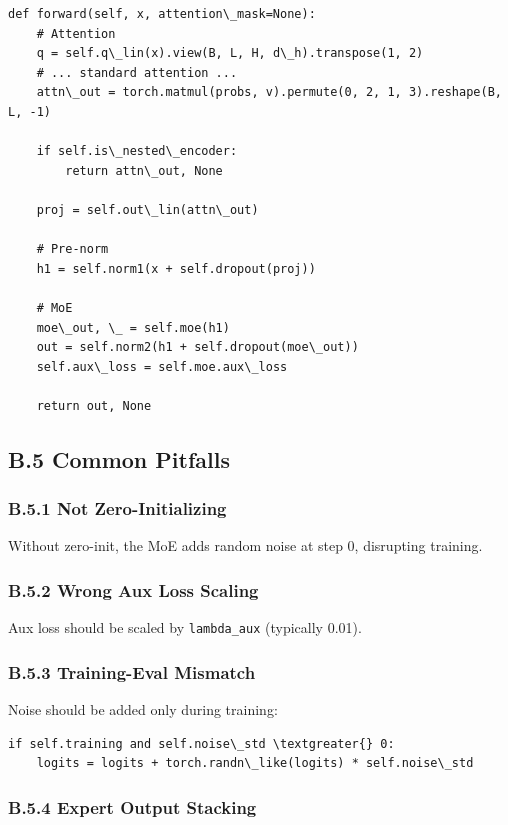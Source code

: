 \begin{lstlisting}
def forward(self, x, attention\_mask=None):
    # Attention
    q = self.q\_lin(x).view(B, L, H, d\_h).transpose(1, 2)
    # ... standard attention ...
    attn\_out = torch.matmul(probs, v).permute(0, 2, 1, 3).reshape(B, L, -1)
    
    if self.is\_nested\_encoder:
        return attn\_out, None
    
    proj = self.out\_lin(attn\_out)
    
    # Pre-norm
    h1 = self.norm1(x + self.dropout(proj))
    
    # MoE
    moe\_out, \_ = self.moe(h1)
    out = self.norm2(h1 + self.dropout(moe\_out))
    self.aux\_loss = self.moe.aux\_loss
    
    return out, None
\end{lstlisting}

\subsection{B.5 Common Pitfalls}

\subsubsection{B.5.1 Not Zero-Initializing}

Without zero-init, the MoE adds random noise at step 0, disrupting training.

\subsubsection{B.5.2 Wrong Aux Loss Scaling}

Aux loss should be scaled by \texttt{lambda\_aux} (typically 0.01).

\subsubsection{B.5.3 Training-Eval Mismatch}

Noise should be added only during training:

\begin{lstlisting}
if self.training and self.noise\_std \textgreater{} 0:
    logits = logits + torch.randn\_like(logits) * self.noise\_std
\end{lstlisting}

\subsubsection{B.5.4 Expert Output Stacking}

